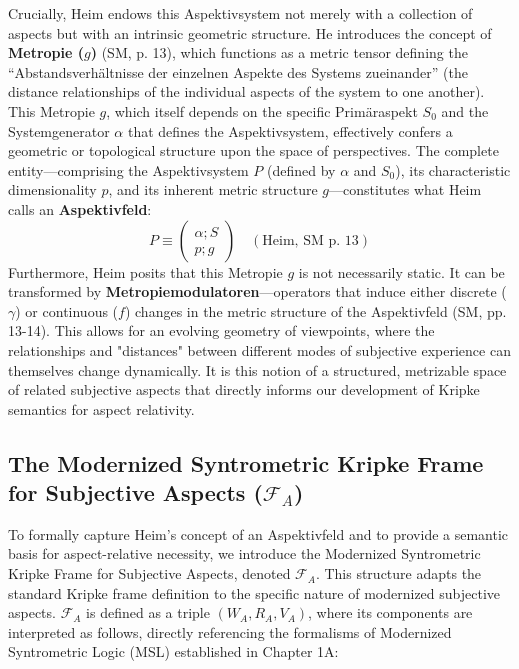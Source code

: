 \documentclass[
    12pt,              %
    a4paper,           %
    headings=normal,   %
    twoside=true,      %
    BCOR=8mm,          %
]{scrbook}
\newcommand{\q}[1]{\enquote{#1}}
\newcommand{\aspektivsystem}{P}
\newcommand{\subjektiveraspekt}{S}
\begin{document}
Crucially, Heim endows this Aspektivsystem not merely with a collection of aspects but with an intrinsic geometric structure. He introduces the concept of \textbf{Metropie (\(g\))} (SM, p. 13), which functions as a metric tensor defining the \q{Abstandsverhältnisse der einzelnen Aspekte des Systems zueinander} (the distance relationships of the individual aspects of the system to one another). This Metropie \(g\), which itself depends on the specific Primäraspekt \(\subjektiveraspekt_0\) and the Systemgenerator \(\alpha\) that defines the Aspektivsystem, effectively confers a geometric or topological structure upon the space of perspectives. The complete entity—comprising the Aspektivsystem \(\aspektivsystem\) (defined by \(\alpha\) and \(\subjektiveraspekt_0\)), its characteristic dimensionality \(p\), and its inherent metric structure \(g\)—constitutes what Heim calls an \textbf{Aspektivfeld}:
\[ \aspektivsystem \equiv \begin{pmatrix} \alpha;\subjektiveraspekt \\ p;g \end{pmatrix} \quad (\text{Heim, SM p. 13}) \]
Furthermore, Heim posits that this Metropie \(g\) is not necessarily static. It can be transformed by \textbf{Metropiemodulatoren}—operators that induce either discrete (\(\gamma\)) or continuous (\(f\)) changes in the metric structure of the Aspektivfeld (SM, pp. 13-14). This allows for an evolving geometry of viewpoints, where the relationships and "distances" between different modes of subjective experience can themselves change dynamically. It is this notion of a structured, metrizable space of related subjective aspects that directly informs our development of Kripke semantics for aspect relativity.

\subsection{The Modernized Syntrometric Kripke Frame for Subjective Aspects (\(\mathcal{F}_A\))}
\label{sec:ch1_kripke_frame} 

To formally capture Heim’s concept of an Aspektivfeld and to provide a semantic basis for aspect-relative necessity, we introduce the Modernized Syntrometric Kripke Frame for Subjective Aspects, denoted \(\mathcal{F}_A\). This structure adapts the standard Kripke frame definition to the specific nature of modernized subjective aspects. \(\mathcal{F}_A\) is defined as a triple \( (W_A, R_A, V_A) \), where its components are interpreted as follows, directly referencing the formalisms of Modernized Syntrometric Logic (MSL) established in Chapter 1A:
\end{document}
